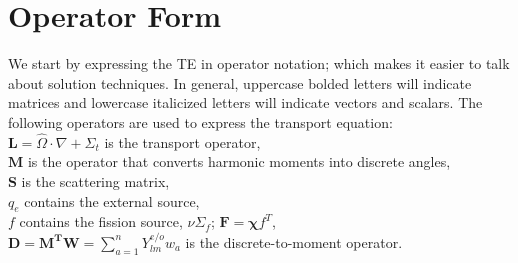 \documentclass[12pt]{article}
\newcommand{\ve}[1]{\ensuremath{\mathbf{#1}}}
\newcommand{\Macro}{\ensuremath{\Sigma}}
\newcommand{\vOmega}{\ensuremath{\hat{\Omega}}}
\begin{document}
\section*{Operator Form}
We start by expressing the TE in operator notation; which makes it easier to talk about solution techniques. In general, uppercase bolded letters will indicate matrices and lowercase italicized letters will indicate vectors and scalars. The following operators are used to express the transport equation:\\
%
\hspace*{2em} $\mathbf{L} = \vOmega \cdot \nabla + \Macro_t$ is the transport operator, \\
\hspace*{2em} $\mathbf{M}$ is the operator that converts harmonic moments into discrete angles, \\
\hspace*{2em} $\mathbf{S}$ is the scattering matrix, \\
\hspace*{2em} $q_e$ contains the external source,\\
\hspace*{2em} $f$ contains the fission source, $\nu \Macro_{f}$; $\mathbf{F} =\mathbf{\chi} f^{T}$, \\ 
\hspace*{2em} $\mathbf{D} = \ve{M^{T}}\ve{W} = \sum_{a=1}^{n}Y^{e/o}_{lm}w_{a}$ is the discrete-to-moment operator. 
\end{document}
